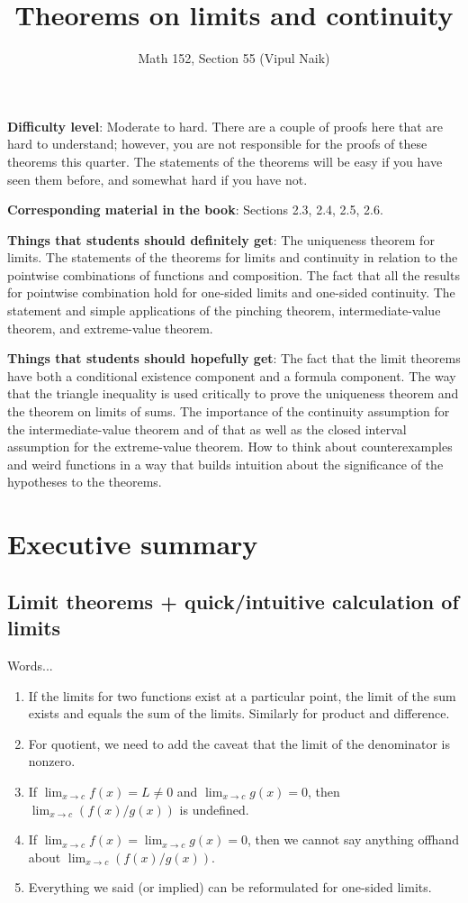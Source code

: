 \documentclass[10pt]{amsart}
\title{Theorems on limits and continuity}
\author{Math 152, Section 55 (Vipul Naik)}
\begin{document}
\maketitle

{\bf Difficulty level}: Moderate to hard. There are a couple of proofs
here that are hard to understand; however, you are not responsible for
the proofs of these theorems this quarter. The statements of the
theorems will be easy if you have seen them before, and somewhat hard
if you have not.

{\bf Corresponding material in the book}: Sections 2.3, 2.4, 2.5, 2.6.

{\bf Things that students should definitely get}: The uniqueness
theorem for limits. The statements of the theorems for limits and
continuity in relation to the pointwise combinations of functions and
composition. The fact that all the results for pointwise combination
hold for one-sided limits and one-sided continuity. The statement and
simple applications of the pinching theorem, intermediate-value
theorem, and extreme-value theorem.

{\bf Things that students should hopefully get}: The fact that the
limit theorems have both a conditional existence component and a
formula component. The way that the triangle inequality is used
critically to prove the uniqueness theorem and the theorem on limits
of sums. The importance of the continuity assumption for the
intermediate-value theorem and of that as well as the closed interval
assumption for the extreme-value theorem. How to think about
counterexamples and weird functions in a way that builds intuition
about the significance of the hypotheses to the theorems.

\section*{Executive summary}

\subsection*{Limit theorems + quick/intuitive calculation of limits}

Words...

\begin{enumerate}
\item If the limits for two functions exist at a particular point, the
  limit of the sum exists and equals the sum of the limits. Similarly
  for product and difference.
\item For quotient, we need to add the caveat that the limit of the
  denominator is nonzero.
\item If $\lim_{x \to c} f(x) = L \ne 0$ and $\lim_{x \to c} g(x) =
  0$, then $\lim_{x \to c} (f(x)/g(x))$ is undefined.
\item If $\lim_{x \to c} f(x) = \lim_{x \to c} g(x) = 0$, then we
  cannot say anything offhand about $\lim_{x \to c} (f(x)/g(x))$.
\item Everything we said (or implied) can be reformulated for
  one-sided limits.
\end{enumerate}
\end{document}
